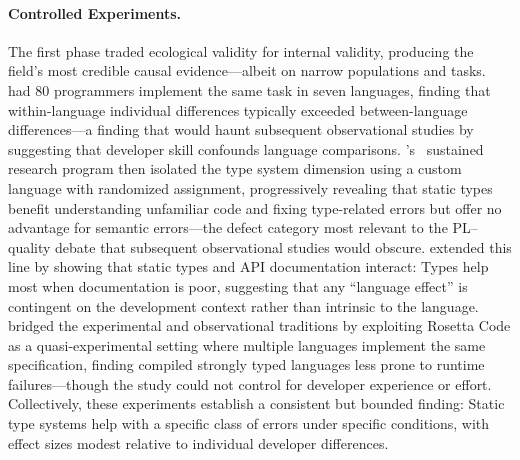 \paragraph{Controlled Experiments.}
The first phase traded ecological validity for internal validity, producing the field's most credible causal evidence---albeit on narrow populations and tasks.
\citet{DBLP:journals/computer/Prechelt00} had 80 programmers implement the same task in seven languages, finding that within-language individual differences typically exceeded between-language differences---a finding that would haunt subsequent observational studies by suggesting that developer skill confounds language comparisons.
\citeauthor{DBLP:conf/oopsla/Hanenberg10}'s~\cite{DBLP:conf/oopsla/Hanenberg10, DBLP:conf/oopsla/MayerHRTS12, DBLP:journals/ese/HanenbergKRTS14} sustained research program then isolated the type system dimension using a custom language with randomized assignment, progressively revealing that static types benefit understanding unfamiliar code and fixing type-related errors but offer no advantage for semantic errors---the defect category most relevant to the PL--quality debate that subsequent observational studies would obscure.
\citet{DBLP:conf/icse/EndrikatHRS14} extended this line by showing that static types and API documentation interact: Types help most when documentation is poor, suggesting that any ``language effect'' is contingent on the development context rather than intrinsic to the language.
\citet{DBLP:conf/icse/NanzF15} bridged the experimental and observational traditions by exploiting Rosetta Code as a quasi-experimental setting where multiple languages implement the same specification, finding compiled strongly typed languages less prone to runtime failures---though the study could not control for developer experience or effort.
Collectively, these experiments establish a consistent but bounded finding: Static type systems help with a specific class of errors under specific conditions, with effect sizes modest relative to individual developer differences.

